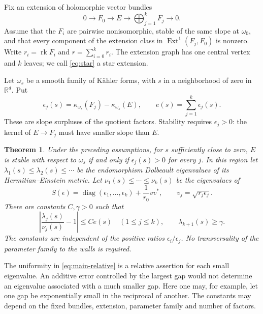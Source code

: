 \documentclass[11pt]{amsart}
\newtheorem{theorem}{Theorem}[section]
\theoremstyle{remark}
\newcommand{\Ext}{\operatorname{Ext}}
\newcommand{\rk}{\operatorname{rk}}
\newcommand{\diag}{\operatorname{diag}}
\newcommand{\RR}{\mathbb R}
\begin{document}
Fix an extension of holomorphic vector bundles
\begin{equation}\label{eq:star}
 0\longrightarrow F_0\longrightarrow E
 \longrightarrow\bigoplus_{j=1}^kF_j\longrightarrow0.
\end{equation}
Assume that the $F_i$ are pairwise nonisomorphic, stable of the same
slope at $\omega_0$, and that every component of the extension class
in $\Ext^1(F_j,F_0)$ is nonzero. Write $r_i=\rk F_i$ and
$r=\sum_{i=0}^kr_i$. The extension graph has one central vertex and
$k$ leaves; we call \eqref{eq:star} a star extension.

Let $\omega_s$ be a smooth family of K\"ahler forms, with $s$ in a
neighborhood of zero in $\RR^d$. Put
\begin{equation}\label{eq:epsilon}
 \epsilon_j(s)=\kappa_{\omega_s}(F_j)-\kappa_{\omega_s}(E),
 \qquad e(s)=\sum_{j=1}^k\epsilon_j(s).
\end{equation}
These are slope surpluses of the quotient factors. Stability requires
$\epsilon_j>0$: the kernel of $E\to F_j$ must have smaller slope
than $E$.

\begin{theorem}\label{thm:main}
Under the preceding assumptions, for $s$ sufficiently close to zero,
$E$ is stable with respect to $\omega_s$ if and only if
$\epsilon_j(s)>0$ for every $j$.
In this region let $\lambda_1(s)\le\lambda_2(s)\le\cdots$ be the
endomorphism Dolbeault eigenvalues of its Hermitian--Einstein metric.
Let $\nu_1(s)\le\cdots\le\nu_k(s)$ be the eigenvalues of
\begin{equation}\label{eq:rank-matrix}
 S(\epsilon)=\diag(\epsilon_1,\ldots,\epsilon_k)
       +\frac1{r_0}vv^*,\qquad v_j=\sqrt{r_j\epsilon_j}.
\end{equation}
There are constants $C,\gamma>0$ such that
\begin{equation}\label{eq:main-relative}
 \left|\frac{\lambda_j(s)}{\nu_j(s)}-1\right|\le Ce(s)
 \quad(1\le j\le k),\qquad \lambda_{k+1}(s)\ge\gamma.
\end{equation}
The constants are independent of the positive ratios
$\epsilon_i/\epsilon_j$. No transversality of the parameter family
to the walls is required.
\end{theorem}

The uniformity in \eqref{eq:main-relative} is a relative assertion for
each small eigenvalue. An additive error controlled by the largest gap
would not determine an eigenvalue associated with a much smaller gap.
Here one may, for example, let one gap be exponentially small in the
reciprocal of another. The constants may depend on the fixed bundles,
extension, parameter family and number of factors.
\end{document}
